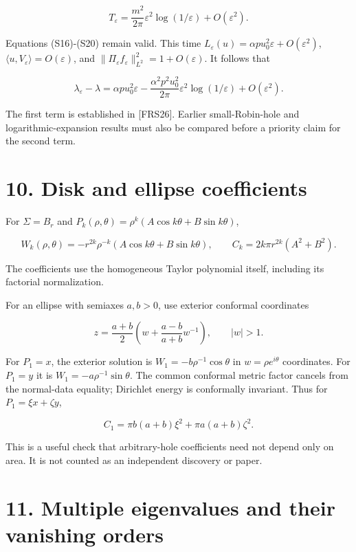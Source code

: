 \documentclass[11pt]{article}
\begin{document}
\[
 T_\varepsilon
 =\frac{m^2}{2\pi}\varepsilon^2\log(1/\varepsilon)
   +O(\varepsilon^2).
 \tag{S25}
\]

Equations (S16)-(S20) remain valid. This time
\(L_\varepsilon(u)=\alpha p u_0^2\varepsilon+O(\varepsilon^2)\),
\(\langle u,V_\varepsilon\rangle=O(\varepsilon)\), and
\(\|\Pi_\varepsilon f_\varepsilon\|_{L^2}^2=1+O(\varepsilon)\). It
follows that

\[
 \lambda_\varepsilon-\lambda
 =\alpha p u_0^2\varepsilon
 -\frac{\alpha^2p^2u_0^2}{2\pi}\varepsilon^2\log(1/\varepsilon)
 +O(\varepsilon^2).
 \tag{S26}
\]

The first term is established in {[}FRS26{]}. Earlier small-Robin-hole
and logarithmic-expansion results must also be compared before a
priority claim for the second term.

\section{10. Disk and ellipse
coefficients}\label{disk-and-ellipse-coefficients}

For \(\Sigma=B_r\) and
\(P_k(\rho,\theta)=\rho^k(A\cos k\theta+B\sin k\theta)\),

\[
 W_k(\rho,\theta)=-r^{2k}\rho^{-k}
                         (A\cos k\theta+B\sin k\theta),
 \qquad
 C_k=2k\pi r^{2k}(A^2+B^2).
 \tag{S27}
\]

The coefficients use the homogeneous Taylor polynomial itself, including
its factorial normalization.

For an ellipse with semiaxes \(a,b>0\), use exterior conformal
coordinates

\[
 z=\frac{a+b}{2}\left(w+\frac{a-b}{a+b}w^{-1}\right),\qquad |w|>1.
\]

For \(P_1=x\), the exterior solution is \(W_1=-b\rho^{-1}\cos\theta\) in
\(w=\rho e^{i\theta}\) coordinates. For \(P_1=y\) it is
\(W_1=-a\rho^{-1}\sin\theta\). The common conformal metric factor
cancels from the normal-data equality; Dirichlet energy is conformally
invariant. Thus for \(P_1=\xi x+\zeta y\),

\[
 C_1=\pi b(a+b)\xi^2+\pi a(a+b)\zeta^2.
 \tag{S28}
\]

This is a useful check that arbitrary-hole coefficients need not depend
only on area. It is not counted as an independent discovery or paper.

\section{11. Multiple eigenvalues and their vanishing
orders}\label{multiple-eigenvalues-and-their-vanishing-orders}
\end{document}
